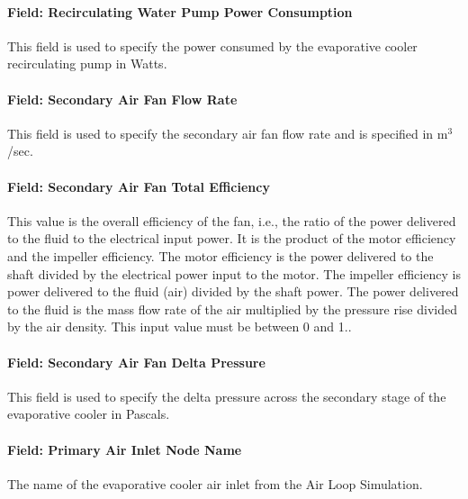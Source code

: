 \paragraph{Field: Recirculating Water Pump Power Consumption}\label{field-recirculating-water-pump-power-consumption-2}

This field is used to specify the power consumed by the evaporative cooler recirculating pump in Watts.

\paragraph{Field: Secondary Air Fan Flow Rate}\label{field-secondary-air-fan-flow-rate-1}

This field is used to specify the secondary air fan flow rate and is specified in m\(^{3}\)/sec.

\paragraph{Field: Secondary Air Fan Total Efficiency}\label{field-secondary-air-fan-total-efficiency}

This value is the overall efficiency of the fan, i.e., the ratio of the power delivered to the fluid to the electrical input power. It is the product of the motor efficiency and the impeller efficiency. The motor efficiency is the power delivered to the shaft divided by the electrical power input to the motor. The impeller efficiency is power delivered to the fluid (air) divided by the shaft power. The power delivered to the fluid is the mass flow rate of the air multiplied by the pressure rise divided by the air density. This input value must be between 0 and 1..

\paragraph{Field: Secondary Air Fan Delta Pressure}\label{field-secondary-air-fan-delta-pressure}

This field is used to specify the delta pressure across the secondary stage of the evaporative cooler in Pascals.

\paragraph{Field: Primary Air Inlet Node Name}\label{field-primary-air-inlet-node-name-1}

The name of the evaporative cooler air inlet from the Air Loop Simulation.

